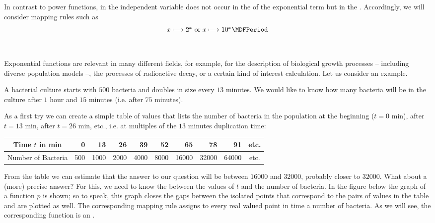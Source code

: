 \begin{MIntro}

In contrast to power functions, in  the independent variable 
does not occur in the  of the exponential term but in the .
Accordingly, we will consider mapping rules such as
$$x \longmapsto 2^x\; \text{or}\; x \longmapsto 10^x \MDFPeriod$$
\ \\ \ \\
Exponential functions are relevant in many different fields, for example, for the description of 
biological growth processes -- including diverse population models --, the processes of radioactive decay, or 
a certain kind of interest calculation. Let us consider an example.

\begin{MExample}

A bacterial culture starts with $500$ bacteria and doubles in size every $13$ minutes. We would like to know how many
bacteria will be in the culture after $1$ hour and $15$ minutes (i.e. after $75$ minutes).

As a first try we can create a simple table of values that lists the number of bacteria in the population at 
the beginning ($t=0$ min), after $t = 13$ min, after $t = 26$ min, etc., i.e. at multiples of the 
$13$ minutes duplication time:
\begin{center}
 \begin{tabular}{|c|r|r|r|r|r|r|r|r|c|}
 \hline
 Time $t$ in min & 0 & 13 & 26 & 39 & 52 & 65 & 78 & 91 & etc. \\ \hline
 Number of Bacteria & 500 & 1000 & 2000 & 4000 & 8000 & 16000 & 32000 & 64000 & etc. \\ 
 \hline
 \end{tabular}
\end{center}
From the table we can estimate that the answer to our question will be between $16000$ and $32000$, probably 
closer to $32000$. What about a (more) precise answer? For this, we need to know the 
 between the values of $t$ and the number of bacteria. In the figure below 
the graph of a function $p$ is shown; so to speak, this graph closes the gaps between the isolated points that 
correspond to the pairs of values in the table and are plotted as well. The corresponding mapping rule 
assigns to every real valued point in time a number of bacteria. As we will see, the corresponding function 
is an .


\end{MExample}
\end{MIntro}
